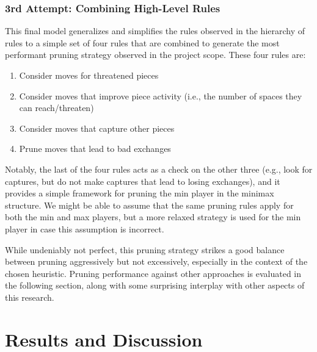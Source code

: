 \documentclass[letterpaper]{article}
\begin{document}
\subsubsection{3rd Attempt: Combining High-Level Rules}
This final model generalizes and simplifies the rules observed in the hierarchy of rules to a simple set of four rules that are combined to generate the most performant pruning strategy observed in the project scope.  These four rules are:
\begin{enumerate}
    \item Consider moves for threatened pieces
    \item Consider moves that improve piece activity (i.e., the number of spaces they can reach/threaten)
    \item Consider moves that capture other pieces
    \item Prune moves that lead to bad exchanges
\end{enumerate}
Notably, the last of the four rules acts as a check on the other three (e.g., look for captures, but do not make captures that lead to losing exchanges), and it provides a simple framework for pruning the min player in the minimax structure.  We might be able to assume that the same pruning rules apply for both the min and max players, but a more relaxed strategy is used for the min player in case this assumption is incorrect.

While undeniably not perfect, this pruning strategy strikes a good balance between pruning aggressively but not excessively, especially in the context of the chosen heuristic.  Pruning performance against other approaches is evaluated in the following section, along with some surprising interplay with other aspects of this research.

\section{Results and Discussion}
\end{document}

